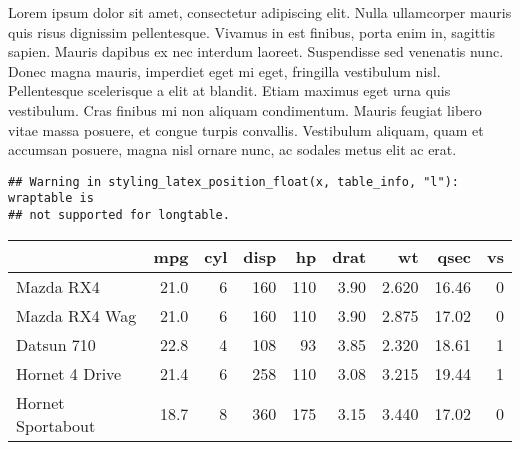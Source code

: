 \documentclass[]{article}
\newenvironment{Shaded}{\begin{snugshade}}{\end{snugshade}}
\newcommand{\KeywordTok}[1]{\textcolor[rgb]{0.13,0.29,0.53}{\textbf{{#1}}}}
\newcommand{\DataTypeTok}[1]{\textcolor[rgb]{0.13,0.29,0.53}{{#1}}}
\newcommand{\DecValTok}[1]{\textcolor[rgb]{0.00,0.00,0.81}{{#1}}}
\newcommand{\StringTok}[1]{\textcolor[rgb]{0.31,0.60,0.02}{{#1}}}
\newcommand{\NormalTok}[1]{{#1}}
\begin{document}
\endgroup

Lorem ipsum dolor sit amet, consectetur adipiscing elit. Nulla
ullamcorper mauris quis risus dignissim pellentesque. Vivamus in est
finibus, porta enim in, sagittis sapien. Mauris dapibus ex nec interdum
laoreet. Suspendisse sed venenatis nunc. Donec magna mauris, imperdiet
eget mi eget, fringilla vestibulum nisl. Pellentesque scelerisque a elit
at blandit. Etiam maximus eget urna quis vestibulum. Cras finibus mi non
aliquam condimentum. Mauris feugiat libero vitae massa posuere, et
congue turpis convallis. Vestibulum aliquam, quam et accumsan posuere,
magna nisl ornare nunc, ac sodales metus elit ac erat.

\begin{Shaded}
\end{Shaded}

\begin{verbatim}
## Warning in styling_latex_position_float(x, table_info, "l"): wraptable is
## not supported for longtable.
\end{verbatim}

\begingroup\fontsize{6}{8}\selectfont

\begin{longtable}[l]{l|r|r|r|r|r|r|r|r}
\hline
  & mpg & cyl & disp & hp & drat & wt & qsec & vs\\
\hline
Mazda RX4 & 21.0 & 6 & 160 & 110 & 3.90 & 2.620 & 16.46 & 0\\
\hline
Mazda RX4 Wag & 21.0 & 6 & 160 & 110 & 3.90 & 2.875 & 17.02 & 0\\
\hline
Datsun 710 & 22.8 & 4 & 108 & 93 & 3.85 & 2.320 & 18.61 & 1\\
\hline
Hornet 4 Drive & 21.4 & 6 & 258 & 110 & 3.08 & 3.215 & 19.44 & 1\\
\hline
Hornet Sportabout & 18.7 & 8 & 360 & 175 & 3.15 & 3.440 & 17.02 & 0\\
\hline
\end{longtable}

\endgroup
\end{document}
